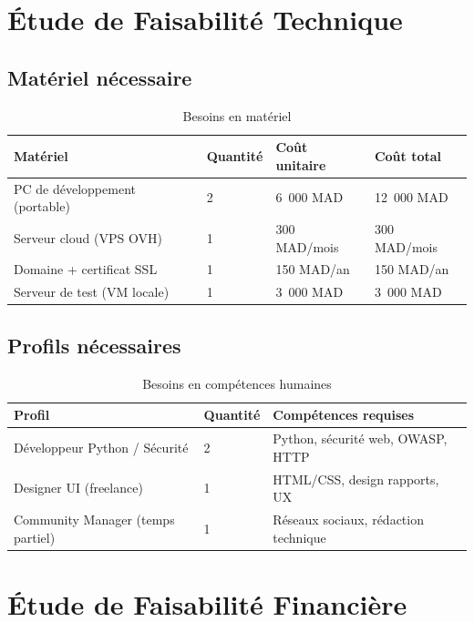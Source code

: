 \documentclass[12pt,a4paper]{report}
\newcommand{\hdr}[1]{\cellcolor{gray!15}\textbf{#1}}
\newcommand{\rowA}{\rowcolor{gray!8}}
\begin{document}
\section{Étude de Faisabilité Technique}

\subsection{Matériel nécessaire}

\begin{table}[H]
\centering
\caption{Besoins en matériel}
\begin{tabular}{p{5cm}p{2cm}p{2.5cm}p{2.5cm}}
\toprule
\hdr{Matériel} & \hdr{Quantité} & \hdr{Coût unitaire} & \hdr{Coût total} \\
\midrule
PC de développement (portable) & 2 & 6~000 MAD & 12~000 MAD \\
\rowA Serveur cloud (VPS OVH) & 1 & 300 MAD/mois & 300 MAD/mois \\
Domaine + certificat SSL & 1 & 150 MAD/an & 150 MAD/an \\
\rowA Serveur de test (VM locale) & 1 & 3~000 MAD & 3~000 MAD \\
\bottomrule
\end{tabular}
\end{table}

\subsection{Profils nécessaires}

\begin{table}[H]
\centering
\caption{Besoins en compétences humaines}
\begin{tabular}{p{4cm}p{2cm}p{6cm}}
\toprule
\hdr{Profil} & \hdr{Quantité} & \hdr{Compétences requises} \\
\midrule
Développeur Python / Sécurité & 2 & Python, sécurité web, OWASP, HTTP \\
\rowA Designer UI (freelance) & 1 & HTML/CSS, design rapports, UX \\
Community Manager (temps partiel) & 1 & Réseaux sociaux, rédaction technique \\
\bottomrule
\end{tabular}
\end{table}

\section{Étude de Faisabilité Financière}
\end{document}
